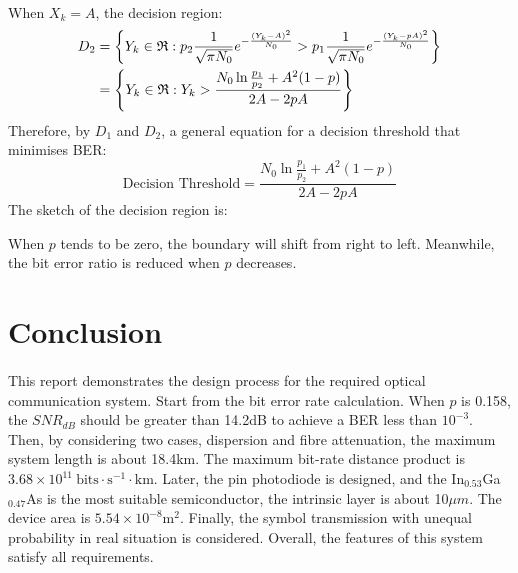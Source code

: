 \documentclass[12pt]{article}
\begin{document}
    \paragraph{}
    When $X_k = A$, the decision region:
    \begin{align}
                D_2 &= \left\{ Y_k \in \mathfrak{R}: p_2 \frac{1}{\sqrt{\pi N_0}} e^{-\frac{(Y_k - A) ^2}{N_0}} > p_1 \frac{1}{\sqrt{\pi N_0}} e^{-\frac{(Y_k - pA)^2}{N_0}}\right\} \notag \\
                &= \left\{ Y_k \in \mathfrak{R}: Y_k > \frac{N_0 \ln \frac{p_1}{p_2} + A^2(1 - p)}{2A - 2pA} \right\}
            \end{align}
    Therefore, by $D_1$ and $D_2$, a general equation for a decision threshold that minimises BER:
    \begin{equation}
        \mbox{Decision Threshold}=\frac{N_0 \ln \frac{p_1}{p_2} + A^2(1 - p)}{2A - 2pA}
    \end{equation}
    The sketch of the decision region is:
    \begin{figure}[H]
                \centering
                \centering
                
            \end{figure}
    When $p$ tends to be zero, the boundary will shift from right to left. Meanwhile, the bit error ratio is reduced when $p$ decreases.
    
    
    \section{Conclusion}
    \paragraph{}
    This report demonstrates the design process for the required optical communication system. Start from the bit error rate calculation. When $p$ is 0.158, the $SNR_{dB}$ should be greater than 14.2dB to achieve a BER less than $10^{-3}$. Then, by considering two cases, dispersion and fibre attenuation, the maximum system length is about 18.4km. The maximum bit-rate distance product is $3.68 \times 10^{11} \ \mbox{bits} \cdot \mbox{s}^{-1} \cdot \mbox{km}$. Later, the pin photodiode is designed, and the In$_{0.53}$Ga$_{0.47}$As is the most suitable semiconductor, the intrinsic layer is about 10$\mu m$. The device area is $5.54 \times 10^{-8}\mbox{m}^2$. Finally, the symbol transmission with unequal probability in real situation is considered. Overall, the features of this system satisfy all requirements.
    
    
    
\end{document}
